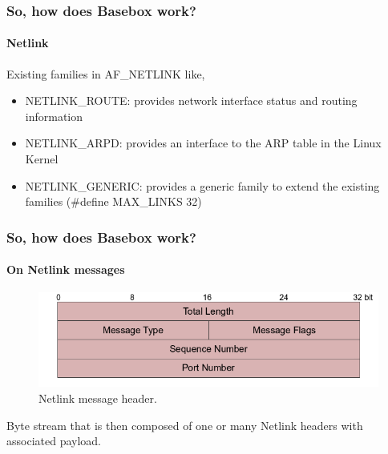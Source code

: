 \documentclass[11pt]{beamer}
\begin{document}
\begin{frame}
\frametitle{So, how does Basebox work?}
\framesubtitle{Netlink}

Existing families in AF\_NETLINK like,

\begin{itemize}
\item NETLINK\_ROUTE: provides network interface status and routing information
\item NETLINK\_ARPD: provides an interface to the ARP table in the Linux Kernel
\item NETLINK\_GENERIC: provides a generic family to extend the existing families (\#define MAX\_LINKS 32) %
\end{itemize}

\end{frame}

\begin{frame}
\frametitle{So, how does Basebox work?}
\framesubtitle{On Netlink messages}

\begin{minipage}[t]{0.48\linewidth}
\centering
\begin{figure}
\includegraphics[scale=0.3]{nlmsghdr.png}
\caption{Netlink message header.}
\end{figure}
\end{minipage}
\begin{minipage}[t]{0.48\linewidth}

Byte stream that is then composed of one or many Netlink headers with associated payload.

\end{minipage}
\end{frame}
\end{document}
